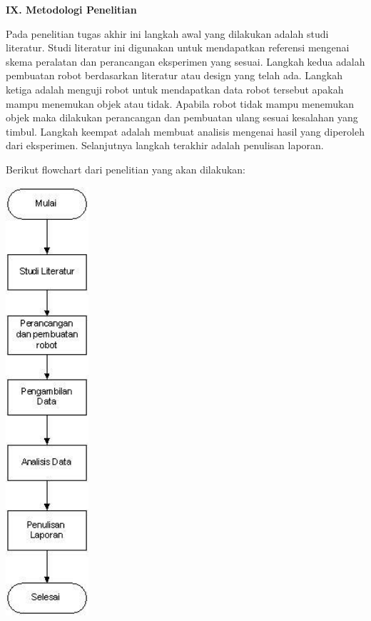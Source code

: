 \documentclass[a4paper,12pt]{article}
\begin{document}
\newpage
\noindent \textbf{IX. \hspace{9pt} Metodologi Penelitian}

Pada penelitian tugas akhir ini langkah awal yang dilakukan adalah studi literatur.
Studi literatur ini digunakan untuk mendapatkan referensi mengenai skema peralatan dan perancangan eksperimen yang sesuai.
Langkah kedua adalah pembuatan robot berdasarkan literatur atau design yang telah ada.
Langkah ketiga adalah menguji robot untuk mendapatkan data robot tersebut apakah mampu menemukan objek atau tidak.
Apabila robot tidak mampu menemukan objek maka dilakukan perancangan dan pembuatan ulang sesuai kesalahan yang timbul.
Langkah keempat adalah membuat analisis mengenai hasil yang diperoleh dari eksperimen. 
Selanjutnya langkah terakhir adalah penulisan laporan.

Berikut flowchart dari penelitian yang akan dilakukan:

\begin{center}
 \includegraphics[height=450pt]{flow}
\end{center}

\newpage
\end{document}
